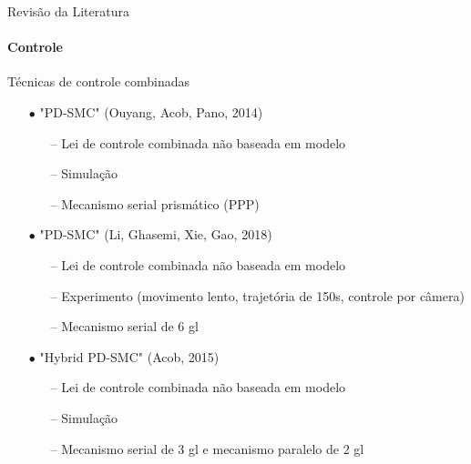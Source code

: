 \documentclass[25pt,landscape]{beamer}
\begin{document}
\begin{frame}{Revisão da Literatura}
    \framesubtitle{Controle}
    \begin{block}{Técnicas de controle combinadas}
        \begin{itemize}
            \item[$\bullet$] "PD-SMC" (Ouyang, Acob, Pano, 2014)
            \begin{itemize}
            	\item[--] Lei de controle combinada não baseada em modelo
            	\item[--] Simulação
            	\item[--] Mecanismo serial prismático (PPP)
            \end{itemize}
            \item[$\bullet$] "PD-SMC" (Li, Ghasemi, Xie, Gao, 2018)
            \begin{itemize}
            	\item[--] Lei de controle combinada não baseada em modelo
            	\item[--] Experimento (movimento lento, trajetória de 150s, controle por câmera)
            	\item[--] Mecanismo serial de 6 gl
            \end{itemize}
            \item[$\bullet$] "Hybrid PD-SMC" (Acob, 2015)
            \begin{itemize}
            	\item[--] Lei de controle combinada não baseada em modelo
            	\item[--] Simulação
            	\item[--] Mecanismo serial de 3 gl e mecanismo paralelo de 2 gl
            \end{itemize}
        \end{itemize}
    \end{block}
\end{frame}
\end{document}
